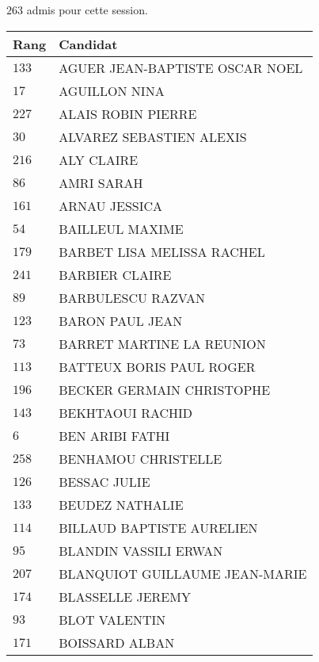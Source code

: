 




  $263$ admis pour cette session.

  \begin{xltabular}{\linewidth}{|l|X|}
    \hline
    \textbf{Rang} & \textbf{Candidat} \\
    \hline
    $133$ & AGUER JEAN-BAPTISTE OSCAR NOEL \\
    \hline
    $17$ & AGUILLON NINA \\
    \hline
    $227$ & ALAIS ROBIN PIERRE \\
    \hline
    $30$ & ALVAREZ SEBASTIEN ALEXIS \\
    \hline
    $216$ & ALY CLAIRE \\
    \hline
    $86$ & AMRI SARAH \\
    \hline
    $161$ & ARNAU JESSICA \\
    \hline
    $54$ & BAILLEUL MAXIME \\
    \hline
    $179$ & BARBET LISA MELISSA RACHEL \\
    \hline
    $241$ & BARBIER CLAIRE \\
    \hline
    $89$ & BARBULESCU RAZVAN \\
    \hline
    $123$ & BARON PAUL JEAN \\
    \hline
    $73$ & BARRET MARTINE LA REUNION \\
    \hline
    $113$ & BATTEUX BORIS PAUL ROGER \\
    \hline
    $196$ & BECKER GERMAIN CHRISTOPHE \\
    \hline
    $143$ & BEKHTAOUI RACHID \\
    \hline
    $6$ & BEN ARIBI FATHI \\
    \hline
    $258$ & BENHAMOU CHRISTELLE \\
    \hline
    $126$ & BESSAC JULIE \\
    \hline
    $133$ & BEUDEZ NATHALIE \\
    \hline
    $114$ & BILLAUD BAPTISTE AURELIEN \\
    \hline
    $95$ & BLANDIN VASSILI ERWAN \\
    \hline
    $207$ & BLANQUIOT GUILLAUME JEAN-MARIE \\
    \hline
    $174$ & BLASSELLE JEREMY \\
    \hline
    $93$ & BLOT VALENTIN \\
    \hline
    $171$ & BOISSARD ALBAN \\

\end{xltabular}
